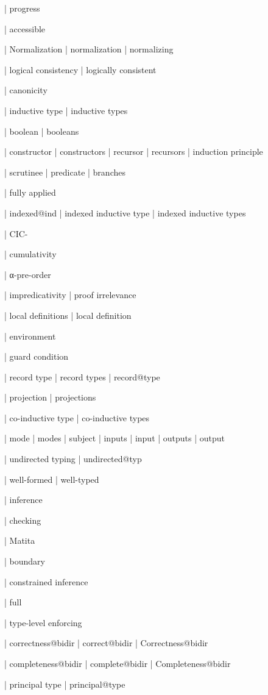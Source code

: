   | progress

  | accessible

  | Normalization
  | normalization
  | normalizing

  | logical consistency
  | logically consistent

  | canonicity


  | inductive type
  | inductive types

  | boolean
  | booleans

  | constructor
  | constructors
  | recursor
  | recursors
  | induction principle

  | scrutinee
  | predicate
  | branches

  | fully applied

  | indexed@ind
  | indexed inductive type
  | indexed inductive types

  | CIC-


  | cumulativity

  | α-pre-order

  | impredicativity
  | proof irrelevance

  | local definitions
  | local definition

  | environment

  | guard condition

  | record type
  | record types
  | record@type

  | projection
  | projections

  | co-inductive type
  | co-inductive types


  | mode
  | modes
  | subject
  | inputs
  | input
  | outputs
  | output

  | undirected typing
  | undirected@typ


  | well-formed
  | well-typed

  | inference

  | checking

  | Matita

  | boundary

  | constrained inference

  | full

  | type-level enforcing

  | correctness@bidir
  | correct@bidir
  | Correctness@bidir

  | completeness@bidir
  | complete@bidir
  | Completeness@bidir


  | principal type
  | principal@type